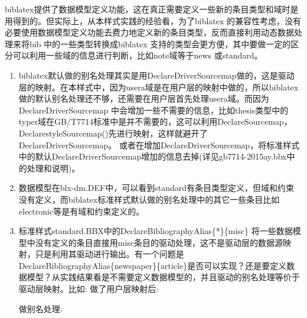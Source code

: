   biblatex提供了数据模型定义功能，这在真正需要定义一些新的条目类型和域时是用得到的。但实际上，从本样式实践的经验看，为了biblatex 的兼容性考虑，没有必要使用数据模型定义功能去费力地定义新的条目类型，反而直接利用动态数据处理来将bib 中的一些类型转换成biblatex 支持的类型会更方便，其中要做一定的区分可以利用一些域的信息进行判断，比如note域等于news 或standard。
  \begin{enumerate}
      \item biblatex默认做的别名处理其实是用DeclareDriverSourcemap做的，这是驱动层的映射。在本样式中，因为usera域是在用户层的映射中做的，所以biblatex做的默认别名处理还不够，还需要在用户层首先处理usera域。而因为DeclareDriverSourcemap 中会增加一些不需要的信息，比如thesis类型中的typer域在GB/T7714标准中是并不需要的，这可以利用DeclareSourcemap，DeclarestyleSourcemap()先进行映射，这样就避开了DeclareDriverSourcemap。 或者在增加DeclareDriverSourcemap，将标准样式中的默认DeclareDriverSourcemap增加的信息去掉(详见gb7714-2015ay.bbx中的处理和说明)。
      \item 数据模型在blx-dm.DEF中，可以看到standard有条目类型定义，但域和约束没有定义，而biblatex标准样式默认做的别名处理中的其它一些条目比如electronic等是有域和约束定义的。
      \item 标准样式standard.BBX中的DeclareBibliographyAlias\{*\}\{misc\} 将一些数据模型中没有定义的条目直接用misc条目的驱动处理，这不是驱动层的数据源映射，只是利用其驱动进行输出。有一个问题是DeclareBibliographyAlias\{newspaper\}\{article\}是否可以实现？还是要定义数据模型？从实践结果看是不需要定义数据模型的，并且驱动的别名处理等价于驱动层映射。比如:
          做了用户层映射后:
          \begin{texlist}
            \end{texlist}

            做别名处理:
            \begin{texlist}
            \end{texlist}


\end{enumerate}
